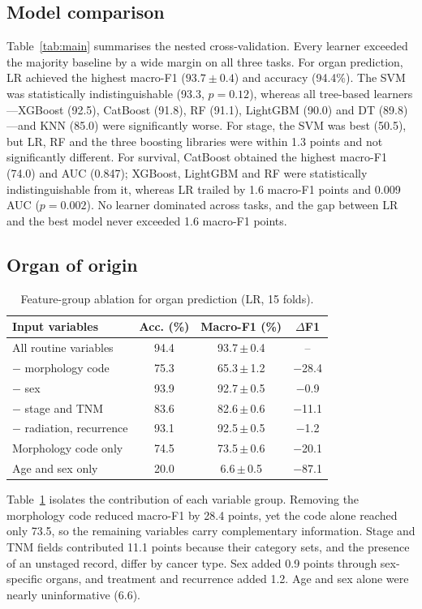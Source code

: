 \documentclass[conference]{IEEEtran}
\begin{document}
\subsection{Model comparison}
Table~\ref{tab:main} summarises the nested cross-validation. Every learner exceeded the majority baseline by a wide margin on all three tasks. For organ prediction, LR achieved the highest macro-F1 ($93.7\pm0.4$) and accuracy (94.4\%). The SVM was statistically indistinguishable (93.3, $p=0.12$), whereas all tree-based learners---XGBoost (92.5), CatBoost (91.8), RF (91.1), LightGBM (90.0) and DT (89.8)---and KNN (85.0) were significantly worse. For stage, the SVM was best (50.5), but LR, RF and the three boosting libraries were within 1.3 points and not significantly different. For survival, CatBoost obtained the highest macro-F1 (74.0) and AUC (0.847); XGBoost, LightGBM and RF were statistically indistinguishable from it, whereas LR trailed by 1.6 macro-F1 points and 0.009 AUC ($p=0.002$). No learner dominated across tasks, and the gap between LR and the best model never exceeded 1.6 macro-F1 points.

\subsection{Organ of origin}
\begin{table}[t]
\caption{Feature-group ablation for organ prediction (LR, 15 folds).}
\label{tab:ablation}
\centering
\footnotesize
\setlength{\tabcolsep}{4pt}
\begin{tabular}{lccc}
\toprule
Input variables & Acc. (\%) & Macro-F1 (\%) & $\Delta$F1 \\
\midrule
All routine variables & 94.4 & 93.7\,$\pm$\,0.4 & -- \\
\quad $-$ morphology code & 75.3 & 65.3\,$\pm$\,1.2 & $-$28.4 \\
\quad $-$ sex & 93.9 & 92.7\,$\pm$\,0.5 & $-$0.9 \\
\quad $-$ stage and TNM & 83.6 & 82.6\,$\pm$\,0.6 & $-$11.1 \\
\quad $-$ radiation, recurrence & 93.1 & 92.5\,$\pm$\,0.5 & $-$1.2 \\
Morphology code only & 74.5 & 73.5\,$\pm$\,0.6 & $-$20.1 \\
Age and sex only & 20.0 & 6.6\,$\pm$\,0.5 & $-$87.1 \\
\bottomrule
\end{tabular}
\end{table}

Table~\ref{tab:ablation} isolates the contribution of each variable group. Removing the morphology code reduced macro-F1 by 28.4 points, yet the code alone reached only 73.5, so the remaining variables carry complementary information. Stage and TNM fields contributed 11.1 points because their category sets, and the presence of an unstaged record, differ by cancer type. Sex added 0.9 points through sex-specific organs, and treatment and recurrence added 1.2. Age and sex alone were nearly uninformative (6.6).
\end{document}

